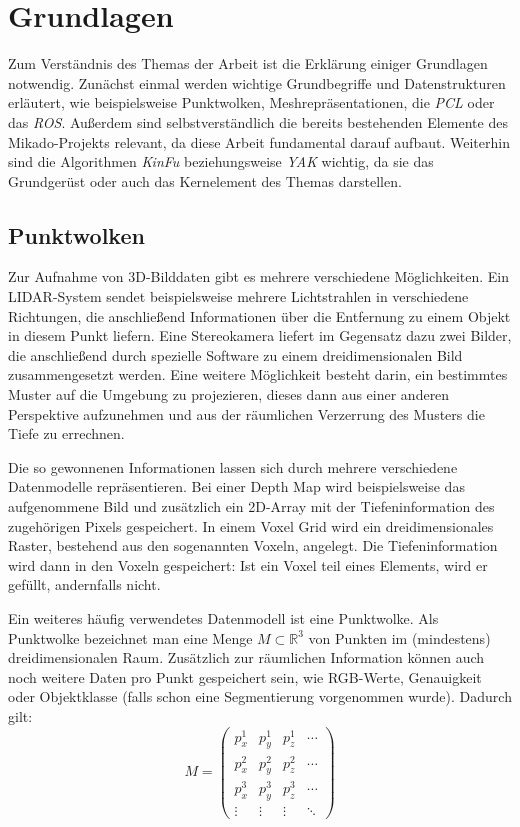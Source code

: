 
\chapter{Grundlagen}

Zum Verständnis des Themas der Arbeit ist die Erklärung einiger Grundlagen notwendig.
Zunächst einmal werden wichtige Grundbegriffe und Datenstrukturen erläutert, wie beispielsweise Punktwolken, Meshrepräsentationen, die \textit{\ac{PCL}} oder das \textit{\ac{ROS}}.
Außerdem sind selbstverständlich die bereits bestehenden Elemente des Mikado-Projekts relevant, da diese Arbeit fundamental darauf aufbaut.
Weiterhin sind die Algorithmen \textit{\ac{KinFu}} beziehungsweise \textit{\ac{YAK}} wichtig, da sie das Grundgerüst oder auch das Kernelement des Themas darstellen.


\section{Punktwolken}

Zur Aufnahme von 3D-Bilddaten gibt es mehrere verschiedene Möglichkeiten.
Ein LIDAR-System sendet beispielsweise mehrere Lichtstrahlen in verschiedene Richtungen, die anschließend Informationen über die Entfernung zu einem Objekt in diesem Punkt liefern.
Eine Stereokamera liefert im Gegensatz dazu zwei Bilder, die anschließend durch spezielle Software zu einem dreidimensionalen Bild zusammengesetzt werden.
Eine weitere Möglichkeit besteht darin, ein bestimmtes Muster auf die Umgebung zu projezieren, dieses dann aus einer anderen Perspektive aufzunehmen und aus der räumlichen Verzerrung des Musters die Tiefe zu errechnen.

Die so gewonnenen Informationen lassen sich durch mehrere verschiedene Datenmodelle repräsentieren.
Bei einer Depth Map wird beispielsweise das aufgenommene Bild und zusätzlich ein 2D-Array mit der Tiefeninformation des zugehörigen Pixels gespeichert.
In einem Voxel Grid wird ein dreidimensionales Raster, bestehend aus den sogenannten Voxeln, angelegt.
Die Tiefeninformation wird dann in den Voxeln gespeichert: Ist ein Voxel teil eines Elements, wird er gefüllt, andernfalls nicht.

Ein weiteres häufig verwendetes Datenmodell ist eine Punktwolke.
Als Punktwolke bezeichnet man eine Menge $M \subset \mathbb{R}^3$ von Punkten im (mindestens) dreidimensionalen Raum.
Zusätzlich zur räumlichen Information können auch noch weitere Daten pro Punkt gespeichert sein, wie RGB-Werte, Genauigkeit oder Objektklasse (falls schon eine Segmentierung vorgenommen wurde).
Dadurch gilt:
$$M = \begin{pmatrix}
p_x^1 & p_y^1 & p_z^1 & \cdots\\
p_x^2 & p_y^2 & p_z^2 & \cdots\\
p_x^3 & p_y^3 & p_z^3 & \cdots\\
\vdots & \vdots & \vdots & \ddots
\end{pmatrix}$$

